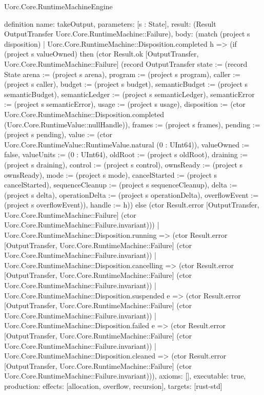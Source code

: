\begin{lexlean}{Uorc.Core.RuntimeMachineEngine}
\begin{semanticmodule}
definition{
  name: takeOutput,
  parameters: [s : State],
  result: (Result OutputTransfer Uorc.Core.RuntimeMachine::Failure),
  body: (match (project s disposition)
    | Uorc.Core.RuntimeMachine::Disposition.completed h => (if (project s valueOwned) then (ctor Result.ok [OutputTransfer, Uorc.Core.RuntimeMachine::Failure] (record OutputTransfer {state := (record State {arena := (project s arena), program := (project s program), caller := (project s caller), budget := (project s budget), semanticBudget := (project s semanticBudget), semanticLedger := (project s semanticLedger), semanticError := (project s semanticError), usage := (project s usage), disposition := (ctor Uorc.Core.RuntimeMachine::Disposition.completed (Uorc.Core.RuntimeValue::nullHandle)), frames := (project s frames), pending := (project s pending), value := (ctor Uorc.Core.RuntimeValue::RuntimeValue.natural (0 : UInt64)), valueOwned := false, valueUnits := (0 : UInt64), oldRoot := (project s oldRoot), draining := (project s draining), control := (project s control), ownsReady := (project s ownsReady), mode := (project s mode), cancelStarted := (project s cancelStarted), sequenceCleanup := (project s sequenceCleanup), delta := (project s delta), operationDelta := (project s operationDelta), overflowEvent := (project s overflowEvent)}), handle := h})) else (ctor Result.error [OutputTransfer, Uorc.Core.RuntimeMachine::Failure] (ctor Uorc.Core.RuntimeMachine::Failure.invariant)))
    | Uorc.Core.RuntimeMachine::Disposition.running => (ctor Result.error [OutputTransfer, Uorc.Core.RuntimeMachine::Failure] (ctor Uorc.Core.RuntimeMachine::Failure.invariant))
    | Uorc.Core.RuntimeMachine::Disposition.cancelling => (ctor Result.error [OutputTransfer, Uorc.Core.RuntimeMachine::Failure] (ctor Uorc.Core.RuntimeMachine::Failure.invariant))
    | Uorc.Core.RuntimeMachine::Disposition.suspended e => (ctor Result.error [OutputTransfer, Uorc.Core.RuntimeMachine::Failure] (ctor Uorc.Core.RuntimeMachine::Failure.invariant))
    | Uorc.Core.RuntimeMachine::Disposition.failed e => (ctor Result.error [OutputTransfer, Uorc.Core.RuntimeMachine::Failure] (ctor Uorc.Core.RuntimeMachine::Failure.invariant))
    | Uorc.Core.RuntimeMachine::Disposition.cleaned => (ctor Result.error [OutputTransfer, Uorc.Core.RuntimeMachine::Failure] (ctor Uorc.Core.RuntimeMachine::Failure.invariant))),
  axioms: [],
  executable: true,
  production: {effects: [allocation, overflow, recursion], targets: [rust-std]}
}


\end{semanticmodule}
\end{lexlean}
